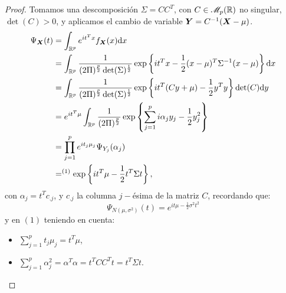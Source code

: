   
  \begin{proof}
    Tomamos una descomposición $\Sigma = CC^T$, con $C\in \mathscr{M}_{p}(\mathbb{R})$ no singular, $\det(C) > 0$, y aplicamos el cambio de variable $\boldsymbol{Y} = C^{-1}(\boldsymbol{X} - \mu)$.
    \[
    \begin{split}
      \Psi_{\boldsymbol{X}}(t) & = \int_{\mathbb R^p} e^{it^T x} f_{\boldsymbol{X}} (x) \mathrm{d}x \\
      & = \int_{\mathbb{R}^p} \frac{1}{(2\Pi)^{\frac{p}{2}}\det(\Sigma)^{\frac{1}{2}}} \exp \left\{ it^Tx - \frac{1}{2}(x-\mu)^T\Sigma^{-1}(x-\mu) \right\}\mathrm{d}x \\
      & =  \int_{\mathbb{R}^p} \frac{1}{(2\Pi)^{\frac{p}{2}}\det(\Sigma)^{\frac{1}{2}}} \exp \left\{ it^T(Cy + \mu)- \frac{1}{2}y^Ty \right\} \det(C)\mathrm{d}y \\
      & = e^{it^T\mu} \int_{\mathbb R^p} \frac{1}{(2\Pi)^{\frac{p}{2}}} \exp \left\{ \sum_{j=1}^p i\alpha_j y_j -  \frac{1}{2}y_j^2 \right\} \\
      & = \prod_{j=1}^p e^{it_j\mu_j}\Psi_{Y_j}(\alpha_j) \\
      & =^{(1)} \exp\left\{it^T \mu- \frac{1}{2}t^T \Sigma t\right\},
    \end{split}
    \]
    con $\alpha_j = t^T c_{.j}$, y $c_{.j}$ la columna $j-$ésima de la matriz $C$, recordando que:
    \[
    \Psi_{N(\mu,\sigma^2)}(t) = e^{it\mu - \frac{1}{2}\sigma^2 t^2}
    \]
    y en $(1)$ teniendo en cuenta:
    \begin{itemize}
    \item $ \sum_{j=1}^p t_j \mu_j = t^T \mu$,
    \item $\sum_{j = 1}^p \alpha_j^2 = \alpha^T \alpha = t^T CC^T t = t^T \Sigma t$.
    \end{itemize}

  \end{proof}

